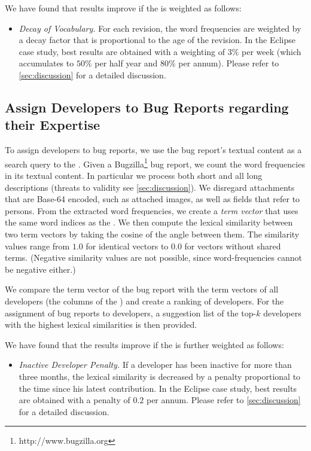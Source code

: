\documentclass[10pt]{book}
\begin{document}
We have found that results improve if the \TAM is weighted as follows:

\begin{itemize}
\item \emph{Decay of Vocabulary.} For each revision, the word frequencies are weighted by a decay factor that is proportional to the age of the revision. In the Eclipse case study, best results are obtained with a weighting of $3\%$ per week (which accumulates to $50\%$ per half year and $80\%$ per annum). Please refer to \autoref{sec:discussion} for a detailed discussion.
\end{itemize}

\subsection{Assign Developers to Bug Reports regarding their Expertise}

To assign developers to bug reports, we use the bug report's textual content as a search query to the \TAM.
Given a Bugzilla\footnote{http://www.bugzilla.org} bug report, we count the word frequencies in its textual content. In particular we process both short and all long descriptions (threats to validity see \autoref{sec:discussion}).
We disregard attachments that are Base-64 encoded, such as attached images, as well as fields that refer to persons. From the extracted word frequencies, we create a \emph{term vector} that uses the same word indices as the \TAM. %
We then compute the lexical similarity between two term vectors by taking the cosine of the angle between them.
The similarity values range from $1.0$ for identical vectors to $0.0$ for vectors without shared terms. (Negative similarity values are not possible, since word-frequencies cannot be negative either.)

We compare the term vector of the bug report with the term vectors of all developers (\ie the columns of the \TAM) and create a ranking of developers. For the assignment of bug reports to developers, a suggestion list of the top-$k$ developers with the highest lexical similarities is then provided.

We have found that the results improve if the \TAM is further weighted as follows:
\begin{itemize}
\item \emph{Inactive Developer Penalty.} If a developer has been inactive for more than three months, the lexical similarity is decreased by a penalty proportional to the time since his latest contribution. In the Eclipse case study, best results are obtained with a penalty of $0.2$ per annum. Please refer to \autoref{sec:discussion} for a detailed discussion.
\end{itemize}
\end{document}

